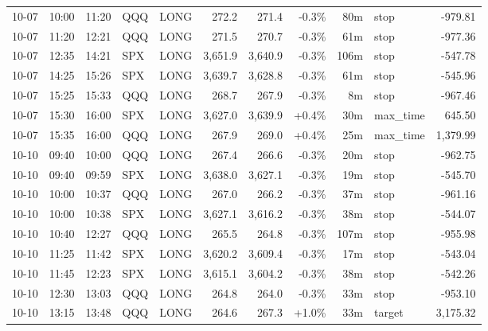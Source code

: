 \documentclass[11pt,a4paper,twoside]{article}
\begin{document}
\begin{center}
\begin{longtable}{>{\color{txtmain}}l l l l l r r r r >{\color{txtmain}}l r}
10-07 & 10:00 & 11:20 & QQQ & LONG & 272.2 & 271.4 & \textcolor{lossred}{-0.3\%} & 80m & stop & \textcolor{lossred}{-979.81} \\
10-07 & 11:20 & 12:21 & QQQ & LONG & 271.5 & 270.7 & \textcolor{lossred}{-0.3\%} & 61m & stop & \textcolor{lossred}{-977.36} \\
10-07 & 12:35 & 14:21 & SPX & LONG & 3,651.9 & 3,640.9 & \textcolor{lossred}{-0.3\%} & 106m & stop & \textcolor{lossred}{-547.78} \\
10-07 & 14:25 & 15:26 & SPX & LONG & 3,639.7 & 3,628.8 & \textcolor{lossred}{-0.3\%} & 61m & stop & \textcolor{lossred}{-545.96} \\
10-07 & 15:25 & 15:33 & QQQ & LONG & 268.7 & 267.9 & \textcolor{lossred}{-0.3\%} & 8m & stop & \textcolor{lossred}{-967.46} \\
10-07 & 15:30 & 16:00 & SPX & LONG & 3,627.0 & 3,639.9 & \textcolor{wingreen}{+0.4\%} & 30m & max\_time & \textcolor{wingreen}{645.50} \\
10-07 & 15:35 & 16:00 & QQQ & LONG & 267.9 & 269.0 & \textcolor{wingreen}{+0.4\%} & 25m & max\_time & \textcolor{wingreen}{1,379.99} \\
10-10 & 09:40 & 10:00 & QQQ & LONG & 267.4 & 266.6 & \textcolor{lossred}{-0.3\%} & 20m & stop & \textcolor{lossred}{-962.75} \\
10-10 & 09:40 & 09:59 & SPX & LONG & 3,638.0 & 3,627.1 & \textcolor{lossred}{-0.3\%} & 19m & stop & \textcolor{lossred}{-545.70} \\
10-10 & 10:00 & 10:37 & QQQ & LONG & 267.0 & 266.2 & \textcolor{lossred}{-0.3\%} & 37m & stop & \textcolor{lossred}{-961.16} \\
10-10 & 10:00 & 10:38 & SPX & LONG & 3,627.1 & 3,616.2 & \textcolor{lossred}{-0.3\%} & 38m & stop & \textcolor{lossred}{-544.07} \\
10-10 & 10:40 & 12:27 & QQQ & LONG & 265.5 & 264.8 & \textcolor{lossred}{-0.3\%} & 107m & stop & \textcolor{lossred}{-955.98} \\
10-10 & 11:25 & 11:42 & SPX & LONG & 3,620.2 & 3,609.4 & \textcolor{lossred}{-0.3\%} & 17m & stop & \textcolor{lossred}{-543.04} \\
10-10 & 11:45 & 12:23 & SPX & LONG & 3,615.1 & 3,604.2 & \textcolor{lossred}{-0.3\%} & 38m & stop & \textcolor{lossred}{-542.26} \\
10-10 & 12:30 & 13:03 & QQQ & LONG & 264.8 & 264.0 & \textcolor{lossred}{-0.3\%} & 33m & stop & \textcolor{lossred}{-953.10} \\
10-10 & 13:15 & 13:48 & QQQ & LONG & 264.6 & 267.3 & \textcolor{wingreen}{+1.0\%} & 33m & target & \textcolor{wingreen}{3,175.32} \\

\end{longtable}
\end{center}
\end{document}
